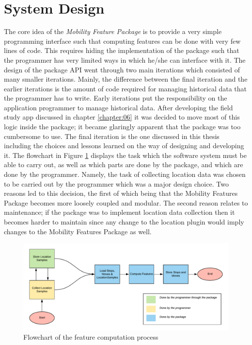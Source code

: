 \section{System Design}
The core idea of the \textit{Mobility Feature Package} is to provide a very simple programming interface such that computing features can be done with very few lines of code. This requires hiding the implementation of the package such that the programmer has very limited ways in which he/she can interface with it. The design of the package API went through two main iterations which consisted of many smaller iterations. Mainly, the difference between the final iteration and the earlier iterations is the amount of code required for managing historical data that the programmer has to write. Early iterations put the responsibility on the application programmer to manage historical data. After developing the field study app discussed in chapter \ref{chapter:06} it was decided to move most of this logic inside the package; it became glaringly apparent that the package was too cumbersome to use. The final iteration is the one discussed in this thesis including the choices and lessons learned on the way of designing and developing it. The flowchart in Figure \ref{fig:flowchart-features} displays the task which the software system must be able to carry out, as well as which parts are done by the package, and which are done by the programmer. Namely, the task of collecting location data was chosen to be carried out by the programmer which was a major design choice. Two reasons led to this decision, the first of which being that the Mobility Features Package becomes more loosely coupled and modular. The second reason relates to maintenance; if the package was to implement location data collection then it becomes harder to maintain since any change to the location plugin would imply changes to the Mobility Features Package as well. 

\begin{figure}[h]
    \centering
    \includegraphics[width=\textwidth]{images/diagrams/flowchart.pdf}
    \caption{Flowchart of the feature computation process}
    \label{fig:flowchart-features}
\end{figure}


